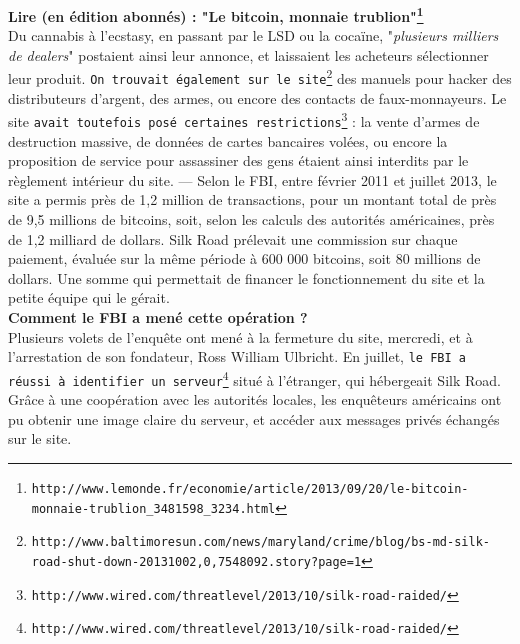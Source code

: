 \documentclass[11pt,twoside,a4paper]{article}
\begin{document}
\textbf{Lire (en {\'e}dition abonn{\'e}s) : "Le bitcoin, monnaie trublion"\footnote{\texttt{http://www.lemonde.fr/economie/article/2013/09/20/le-bitcoin-monnaie-trublion\_3481598\_3234.html}}} ~\\

Du cannabis {\`a} l'ecstasy, en passant par le LSD ou la coca{\"i}ne, "\emph{plusieurs milliers de dealers}" postaient ainsi leur annonce, et laissaient les acheteurs s{\'e}lectionner leur produit. \texttt{On trouvait {\'e}galement sur le site\footnote{\texttt{http://www.baltimoresun.com/news/maryland/crime/blog/bs-md-silk-road-shut-down-20131002,0,7548092.story?page=1}}} des manuels pour hacker des distributeurs d'argent, des armes, ou encore des contacts de faux-monnayeurs. Le site \texttt{avait toutefois pos{\'e} certaines restrictions\footnote{\texttt{http://www.wired.com/threatlevel/2013/10/silk-road-raided/}}} : la vente d'armes de destruction massive, de donn{\'e}es de cartes bancaires vol{\'e}es, ou encore la proposition de service pour assassiner des gens {\'e}taient ainsi interdits par le r{\`e}glement int{\'e}rieur du site. --- Selon le FBI, entre f{\'e}vrier 2011 et juillet 2013, le site a permis pr{\`e}s de 1,2 million de transactions, pour un montant total de pr{\`e}s de 9,5 millions de bitcoins, soit, selon les calculs des autorit{\'e}s am{\'e}ricaines, pr{\`e}s de 1,2 milliard de dollars. Silk Road pr{\'e}levait une commission sur chaque paiement, {\'e}valu{\'e}e sur la m{\^e}me p{\'e}riode {\`a} 600 000 bitcoins, soit 80 millions de dollars. Une somme qui permettait de financer le fonctionnement du site et la petite {\'e}quipe qui le g{\'e}rait. ~\\

	\textbf{Comment le FBI a men{\'e} cette op{\'e}ration ?}~\\

Plusieurs volets de l'enqu{\^e}te ont men{\'e} {\`a} la fermeture du site, mercredi, et {\`a} l'arrestation de son fondateur, Ross William Ulbricht. En juillet, \texttt{le FBI a r{\'e}ussi {\`a} identifier un serveur\footnote{\texttt{http://www.wired.com/threatlevel/2013/10/silk-road-raided/}}} situ{\'e} {\`a} l'{\'e}tranger, qui h{\'e}bergeait Silk Road. Gr{\^a}ce {\`a} une coop{\'e}ration avec les autorit{\'e}s locales, les enqu{\^e}teurs am{\'e}ricains ont pu obtenir une image claire du serveur, et acc{\'e}der aux messages priv{\'e}s {\'e}chang{\'e}s sur le site. ~\\

\clearpage
\end{document}
